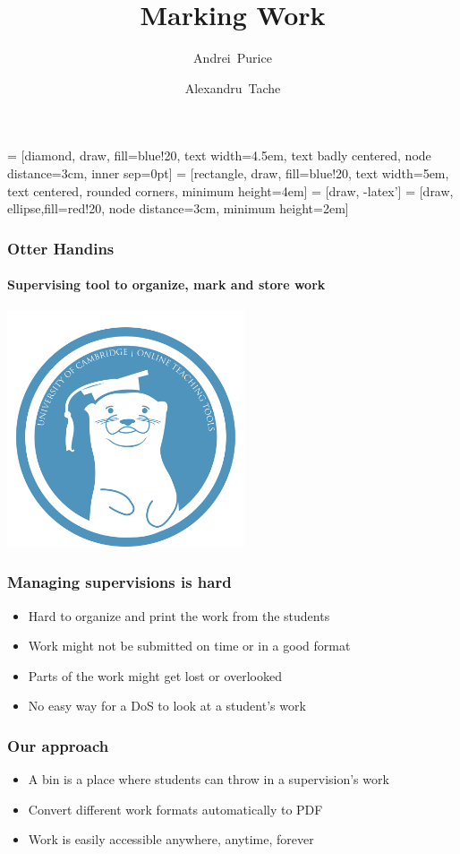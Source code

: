 \documentclass{beamer}
\title %
{Marking Work}
\author[Author, Anders] %
{Andrei~Purice \and Alexandru~Tache}
\begin{document}
   = [diamond, draw, fill=blue!20, 
      text width=4.5em, text badly centered, node distance=3cm, inner sep=0pt]
   = [rectangle, draw, fill=blue!20, 
      text width=5em, text centered, rounded corners, minimum height=4em]
   = [draw, -latex']
   = [draw, ellipse,fill=red!20, node distance=3cm,
      minimum height=2em]
	\begin{frame}
		\frametitle{Otter Handins}
    \framesubtitle{Supervising tool to organize, mark and store work}
		\begin{center}	
		 \includegraphics[height=7cm]{otter.jpg}
		\end{center}
    \end{frame}
	\begin{frame}
    	\frametitle{Managing supervisions is hard}
 
   	   	\begin{itemize}
   	   		\item Hard to organize and print the work from the students
          \item Work might not be submitted on time or in a good format
   	   		\item Parts of the work might get lost or overlooked
   	   		\item No easy way for a DoS to look at a student's work
  	   	 \end{itemize}	   	 
  	\end{frame}
  	\begin{frame}
    	\frametitle{Our approach}
    	\begin{itemize}
        \item A bin is a place where students can throw in a supervision's work
    		\item Convert different work formats automatically to PDF 
    		\item Work is easily accessible anywhere, anytime, forever
    	\end{itemize}
    \end{frame}
    
\end{document}
